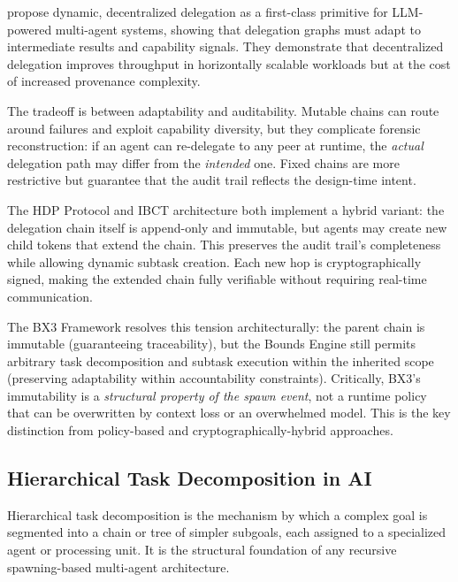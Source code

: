  propose dynamic, decentralized delegation as a first-class primitive for LLM-powered multi-agent systems, showing that delegation graphs must adapt to intermediate results and capability signals. They demonstrate that decentralized delegation improves throughput in horizontally scalable workloads but at the cost of increased provenance complexity.

The tradeoff is between adaptability and auditability. Mutable chains can route around failures and exploit capability diversity, but they complicate forensic reconstruction: if an agent can re-delegate to any peer at runtime, the \emph{actual} delegation path may differ from the \emph{intended} one. Fixed chains are more restrictive but guarantee that the audit trail reflects the design-time intent.

The HDP Protocol \citep{draft-helixar-hdp} and IBCT architecture \citep{aip2025} both implement a hybrid variant: the delegation chain itself is append-only and immutable, but agents may create new child tokens that extend the chain. This preserves the audit trail's completeness while allowing dynamic subtask creation. Each new hop is cryptographically signed, making the extended chain fully verifiable without requiring real-time communication.

The BX3 Framework resolves this tension architecturally: the parent chain is immutable (guaranteeing traceability), but the Bounds Engine still permits arbitrary task decomposition and subtask execution within the inherited scope (preserving adaptability within accountability constraints). Critically, BX3's immutability is a \emph{structural property of the spawn event}, not a runtime policy that can be overwritten by context loss or an overwhelmed model. This is the key distinction from policy-based and cryptographically-hybrid approaches.

\subsection{Hierarchical Task Decomposition in AI}
\label{sec:task-decomp}

Hierarchical task decomposition is the mechanism by which a complex goal is segmented into a chain or tree of simpler subgoals, each assigned to a specialized agent or processing unit. It is the structural foundation of any recursive spawning-based multi-agent architecture.

